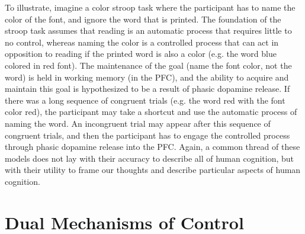 \documentclass[phd,appendix,figures]{uithesis}
\begin{document}
To illustrate, imagine a color stroop task where the participant has to name the color of the font, and ignore the word that is printed.
The foundation of the stroop task assumes that reading is an automatic process that requires little to no control, whereas naming the color is a controlled process that can act in opposition to reading if the printed word is also a color (e.g. the word blue colored in red font).
The maintenance of the goal (name the font color, not the word) is held in working memory (in the PFC), and the ability to acquire and maintain this goal is hypothesized to be a result of phasic dopamine release. 
If there was a long sequence of congruent trials (e.g. the word red with the font color red), the participant may take a shortcut and use the automatic process of naming the word.
An incongruent trial may appear after this sequence of congruent trials, and then the participant has to engage the controlled process through phasic dopamine release into the PFC.
Again, a common thread of these models does not lay with their accuracy to describe all of human cognition, but with their utility to frame our thoughts and describe particular aspects of human cognition. 


\section{Dual Mechanisms of Control}
\end{document}
